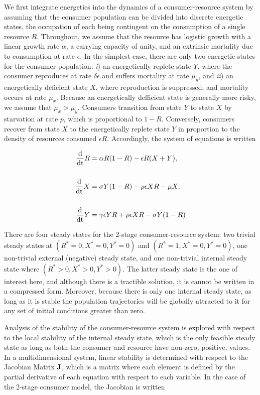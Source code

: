 \documentclass[11pt]{article}
\begin{document}
We first integrate energetics into the dynamics of a consumer-resource system by assuming that the consumer population can be divided into discrete energetic states, the occupation of each being contingent on the consumption of a single resource $R$.
Throughout, we assume that the resource has logistic growth with a linear growth rate $\alpha$, a carrying capacity of unity, and an extrinsic mortality due to consumption at rate $\epsilon$.
In the simplest case, there are only two energetic states for the consumer population: \emph{i}) an energetically replete state $Y$, where the consumer reproduces at rate $\delta \epsilon$ and suffers mortality at rate $\mu_y$, and \emph{ii}) an energetically deficient state $X$, where reproduction is suppressed, and mortality occurs at rate $\mu_x$.
Because an energetically defficient state is generally more risky, we assume that $\mu_x > \mu_y$.
Consumers transition from state $Y$ to state $X$ by starvation at rate $p$, which is proportional to $1-R$.
Conversely, consumers recover from state $X$ to the energetically replete state $Y$ in proportion to the density of resources consumed $\epsilon R$.
Accordingly, the system of equations is written

\begin{align}
\frac{\rm d}{\rm dt} R &= \alpha R(1-R) - \epsilon R(X+Y), \nonumber \\ \nonumber \\
\frac{\rm d}{\rm dt} X &= \sigma Y(1-R) - \rho \epsilon XR - \mu X, \nonumber \\ \nonumber \\
\frac{\rm d}{\rm dt} Y &= \gamma \epsilon YR + \rho \epsilon XR - \sigma Y(1-R)
\end{align}

There are four steady states for the 2-stage consumer-resource system: two trivial steady states at $(R^*=0,X^*=0,Y^*=0)$ and $(R^*=1,X^*=0,Y^*=0)$, one non-trivial external (negative) steady state, and one non-trivial internal steady state where $(R^*>0,X^*>0,Y^*>0)$.
The latter steady state is the one of interest here, and although there is a tractible solution, it is cannot be written in a compressed form.
Moreover, because there is only one internal steady state, as long as it is stable the population trajectories will be globally attracted to it for any set of initial conditions greater than zero.

Analysis of the stability of the consumer-resource system is explored with respect to the local stability of the internal steady state, which is the only feasible steady state as long as both the consumer and resource have non-zero, positive, values.
In a multidimensional system, linear stability is determined with respect to the Jacobian Matrix $\bf J$, which is a matrix where each element is defined by the partial derivative of each equation with respect to each variable.
In the case of the 2-stage consumer model, the Jacobian is written
\end{document}

